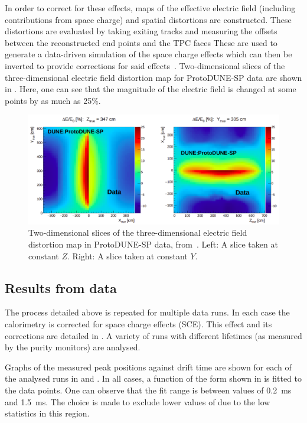 In order to correct for these effects, maps of the effective electric field (including contributions from space charge) and spatial distortions are constructed.
These distortions are evaluated by taking exiting tracks and measuring the offsets between the reconstructed end points and the TPC faces
These are used to generate a data-driven simulation of the space charge effects which can then be inverted to provide corrections for said effects~\cite{protodunePerformance}.
Two-dimensional slices of the three-dimensional electric field distortion map for ProtoDUNE-SP data are shown in . 
Here, one can see that the magnitude of the electric field is changed at some points by as much as 25\%.

\begin{figure}[h]
	\centering
	\includegraphics[width=.9\linewidth]{files/figures/protodune_calibration/eFieldDistortion}
	\caption[Two-dimensional slices of the three-dimensional electric field distortion map in ProtoDUNE-SP data]{Two-dimensional slices of the three-dimensional electric field distortion map in ProtoDUNE-SP data, from~\cite{protodunePerformance}. Left: A slice taken at constant $Z$. Right: A slice taken at constant $Y$.}
	\label{fig:eFieldDistortion}
\end{figure}

\subsection{Results from data}
\label{sec:pdune_calibration:lifetime:data}

The process detailed above is repeated for multiple data runs.
In each case the calorimetry is corrected for space charge effects (SCE). 
This effect and its corrections are detailed in .
A variety of runs with different lifetimes (as measured by the purity monitors) are analysed.

Graphs of the measured \dqdx peak positions against drift time are shown for each of the analysed runs in  and .
In all cases, a function of the form shown in  is fitted to the data points. 
One can observe that the fit range is between \tdrift values of \SI{0.2}{\ms} and \SI{1.5}{\ms}.
The choice is made to exclude lower values of \tdrift due to the low statistics in this region.

